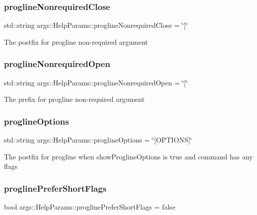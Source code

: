 \subsubsection{\texorpdfstring{progline\+Nonrequired\+Close}{proglineNonrequiredClose}}
{\footnotesize\ttfamily std\+::string args\+::\+Help\+Params\+::progline\+Nonrequired\+Close = \char`\"{}\mbox{]}\char`\"{}}

The postfix for progline non-\/required argument \mbox{\label{structargs_1_1_help_params_a4bc9f39986884a1781966d3bc437cde5}} 
\subsubsection{\texorpdfstring{progline\+Nonrequired\+Open}{proglineNonrequiredOpen}}
{\footnotesize\ttfamily std\+::string args\+::\+Help\+Params\+::progline\+Nonrequired\+Open = \char`\"{}\mbox{[}\char`\"{}}

The prefix for progline non-\/required argument \mbox{\label{structargs_1_1_help_params_a2a160dc5478447bbb180b0a7918ef603}} 
\subsubsection{\texorpdfstring{progline\+Options}{proglineOptions}}
{\footnotesize\ttfamily std\+::string args\+::\+Help\+Params\+::progline\+Options = \char`\"{}\mbox{[}O\+P\+T\+I\+O\+NS\mbox{]}\char`\"{}}

The postfix for progline when show\+Progline\+Options is true and command has any flags \mbox{\label{structargs_1_1_help_params_a27b51014d4e96ea40ba46afcb6f0233c}} 
\subsubsection{\texorpdfstring{progline\+Prefer\+Short\+Flags}{proglinePreferShortFlags}}
{\footnotesize\ttfamily bool args\+::\+Help\+Params\+::progline\+Prefer\+Short\+Flags = false}

